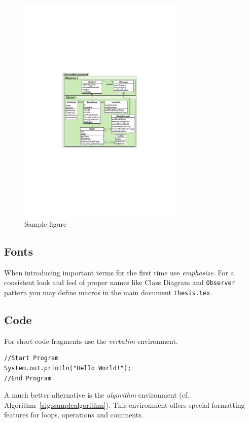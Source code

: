 \documentclass{llncs}
\newcommand{\uml}[1]{\texttt{#1}}
\newcommand{\cd}{\textsf{Class Diagram}}
\begin{document}
\begin{figure}[tb]
	\centering
	\includegraphics[width=0.7\textwidth]{figures/figure1}
	\caption{Sample figure}
	\label{fig:samplefigure_pdf}
\end{figure}


\subsection{Fonts}

When introducing important terms for the first time use \emph{emphasize}. For a consistent look and feel of proper names like {\cd} and {\uml{Observer}} pattern you may define macros in the main document \texttt{thesis.tex}.

\subsection{Code}

For short code fragments use the \textit{verbatim} environment.

\begin{verbatim}
//Start Program
System.out.println("Hello World!");
//End Program
\end{verbatim}

A much better alternative is the \textit{algorithm} environment (cf. Algorithm~\ref{alg:samplealgorithm}). This environment offers special formatting features for loops, operations and comments.
\end{document}
